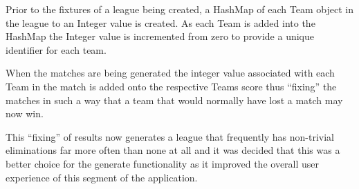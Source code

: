 Prior to the fixtures of a league being created, a HashMap of each
Team object in the league to an Integer value is created. As each Team
is added into the HashMap the Integer value is incremented from zero to
provide a unique identifier for each team.

When the matches are being generated the integer value
associated with each Team in the match is added onto the respective
Teams score thus ``fixing'' the matches in such a way that a team that
would normally have lost a match may now win. 

This ``fixing'' of results now generates a league that frequently has
non-trivial eliminations far more often than none at all and it was
decided that this was a better choice for the generate functionality
as it improved the overall user experience of this segment of the
application. 